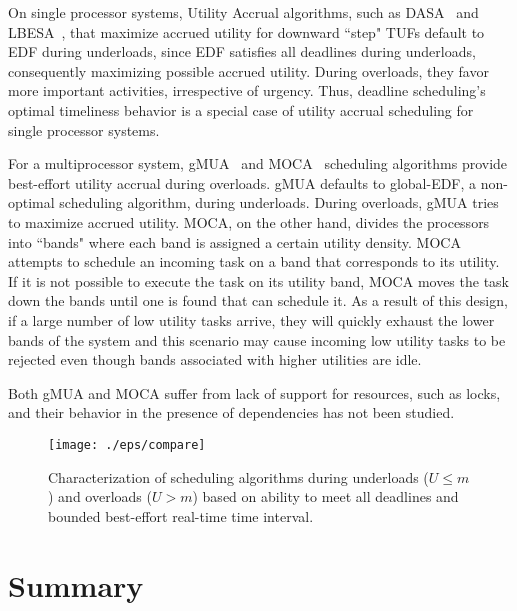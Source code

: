 \documentclass[12pt,dvips]{report}
\begin{document}
On single processor systems, Utility Accrual algorithms, such as DASA~\cite{DASA} and LBESA~\cite{loc86}, that maximize accrued utility for downward ``step" TUFs default to EDF during underloads, since EDF satisfies all deadlines during underloads, consequently maximizing possible accrued utility. During overloads, they favor more important activities, irrespective of urgency. Thus, deadline scheduling's optimal timeliness behavior is a special case of utility accrual scheduling for single processor systems.

For a multiprocessor system, gMUA~\cite{cho-thesis06} and MOCA~\cite{MOCA} scheduling algorithms provide best-effort utility accrual during overloads. gMUA defaults to global-EDF, a non-optimal scheduling algorithm, during underloads. During overloads, gMUA tries to maximize accrued utility. MOCA, on the other hand, divides the processors into ``bands" where each band is assigned a certain utility density. MOCA attempts to schedule an incoming task on a band that corresponds to its utility. If it is not possible to execute the task on its utility band, MOCA moves the task down the bands until one is found that can schedule it. As a result of this design, if a large number of low utility tasks arrive, they will quickly exhaust the lower bands of the system and this scenario may cause incoming low utility tasks to be rejected even though bands associated with higher utilities are idle.

Both gMUA and MOCA suffer from lack of support for resources, such as locks, and their behavior in the presence of dependencies has not been studied.

\begin{figure} [htbp]
  \centering
  \texttt{[image: ./eps/compare]}
  \caption{Characterization of scheduling algorithms during underloads ($U \le m$) and overloads ($U > m$) 
  based on ability to meet all deadlines and bounded best-effort real-time time interval.}
  \label{fig:compare}
\end{figure}

\section{Summary}
\end{document}
